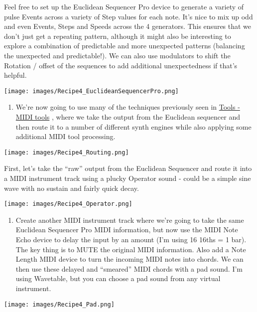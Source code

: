 \documentclass[
  12pt,
  letterpaper,
  oneside,
  open=any]{scrbook}
\providecommand{\tightlist}{%
  \setlength{\itemsep}{0pt}\setlength{\parskip}{0pt}}\usepackage{longtable,booktabs,array}
\begin{document}
Feel free to set up the Euclidean Sequencer Pro device to generate a
variety of pulse Events across a variety of Step values for each note.
It's nice to mix up odd and even Events, Steps and Speeds across the 4
generators. This ensures that we don't just get a repeating pattern,
although it might also be interesting to explore a combination of
predictable and more unexpected patterns (balancing the unexpected and
predictable!). We can also use modulators to shift the Rotation / offset
of the sequences to add additional unexpectedness if that's helpful.

\texttt{[image: images/Recipe4\_EuclideanSequencerPro.png]}

\begin{enumerate}
\def\labelenumi{\arabic{enumi}.}
\setcounter{enumi}{1}
\tightlist
\item
  We're now going to use many of the techniques previously seen in
  \hyperref[Chapter-004-Tools-MIDI_tools]{Tools - MIDI tools} , where we
  take the output from the Euclidean sequencer and then route it to a
  number of different synth engines while also applying some additional
  MIDI tool processing.
\end{enumerate}

\texttt{[image: images/Recipe4\_Routing.png]}

First, let's take the ``raw'' output from the Euclidean Sequencer and
route it into a MIDI instrument track using a plucky Operator sound -
could be a simple sine wave with no sustain and fairly quick decay.

\texttt{[image: images/Recipe4\_Operator.png]}

\begin{enumerate}
\def\labelenumi{\arabic{enumi}.}
\setcounter{enumi}{2}
\tightlist
\item
  Create another MIDI instrument track where we're going to take the
  same Euclidean Sequencer Pro MIDI information, but now use the MIDI
  Note Echo device to delay the input by an amount (I'm using 16 16ths =
  1 bar). The key thing is to MUTE the original MIDI information. Also
  add a Note Length MIDI device to turn the incoming MIDI notes into
  chords. We can then use these delayed and ``smeared'' MIDI chords with
  a pad sound. I'm using Wavetable, but you can choose a pad sound from
  any virtual instrument.
\end{enumerate}

\texttt{[image: images/Recipe4\_Pad.png]}
\end{document}
